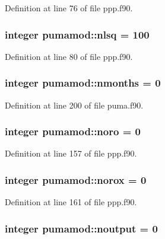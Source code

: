 \-Definition at line 76 of file ppp.\-f90.

\hypertarget{classpumamod_a44c4ca4a17cfda8c24d18f105166817f}{
\subsubsection[{nlsq}]{\setlength{\rightskip}{0pt plus 5cm}integer {\bf pumamod\-::nlsq} = 100}}
\label{classpumamod_a44c4ca4a17cfda8c24d18f105166817f}


\-Definition at line 80 of file ppp.\-f90.

\hypertarget{classpumamod_a5deccef8dbe1e1e9bfb869f67d8a16f1}{
\subsubsection[{nmonths}]{\setlength{\rightskip}{0pt plus 5cm}integer {\bf pumamod\-::nmonths} = 0}}
\label{classpumamod_a5deccef8dbe1e1e9bfb869f67d8a16f1}


\-Definition at line 200 of file puma.\-f90.

\hypertarget{classpumamod_ae291f08906944ef6e0aff0307de74028}{
\subsubsection[{noro}]{\setlength{\rightskip}{0pt plus 5cm}integer {\bf pumamod\-::noro} = 0}}
\label{classpumamod_ae291f08906944ef6e0aff0307de74028}


\-Definition at line 157 of file ppp.\-f90.

\hypertarget{classpumamod_a2724444f4ea0cd1c9ddf8f7b40a0cd5c}{
\subsubsection[{norox}]{\setlength{\rightskip}{0pt plus 5cm}integer {\bf pumamod\-::norox} = 0}}
\label{classpumamod_a2724444f4ea0cd1c9ddf8f7b40a0cd5c}


\-Definition at line 161 of file ppp.\-f90.

\hypertarget{classpumamod_ab83d8b5f0baf291cbf7be672044ddbaf}{
\subsubsection[{noutput}]{\setlength{\rightskip}{0pt plus 5cm}integer {\bf pumamod\-::noutput} = 0}}
\label{classpumamod_ab83d8b5f0baf291cbf7be672044ddbaf}


